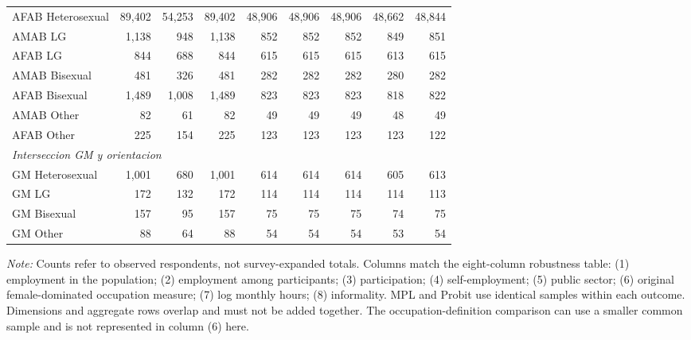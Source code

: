 \begin{table}[htbp]
{\begin{tabular}{lrrrrrrrr}
AFAB Heterosexual & 89,402 & 54,253 & 89,402 & 48,906 & 48,906 & 48,906 & 48,662 & 48,844 \\
AMAB LG & 1,138 & 948 & 1,138 & 852 & 852 & 852 & 849 & 851 \\
AFAB LG & 844 & 688 & 844 & 615 & 615 & 615 & 613 & 615 \\
AMAB Bisexual & 481 & 326 & 481 & 282 & 282 & 282 & 280 & 282 \\
AFAB Bisexual & 1,489 & 1,008 & 1,489 & 823 & 823 & 823 & 818 & 822 \\
AMAB Other & 82 & 61 & 82 & 49 & 49 & 49 & 48 & 49 \\
AFAB Other & 225 & 154 & 225 & 123 & 123 & 123 & 123 & 122 \\
\midrule
\multicolumn{9}{l}{\textit{Interseccion GM y orientacion}} \\
GM Heterosexual & 1,001 & 680 & 1,001 & 614 & 614 & 614 & 605 & 613 \\
GM LG & 172 & 132 & 172 & 114 & 114 & 114 & 114 & 113 \\
GM Bisexual & 157 & 95 & 157 & 75 & 75 & 75 & 74 & 75 \\
GM Other & 88 & 64 & 88 & 54 & 54 & 54 & 53 & 54 \\
\midrule
\bottomrule
\end{tabular}%
}
\par\smallskip\footnotesize\textit{Note:} Counts refer to observed respondents, not survey-expanded totals. Columns match the eight-column robustness table: (1) employment in the population; (2) employment among participants; (3) participation; (4) self-employment; (5) public sector; (6) original female-dominated occupation measure; (7) log monthly hours; (8) informality. MPL and Probit use identical samples within each outcome. Dimensions and aggregate rows overlap and must not be added together. The occupation-definition comparison can use a smaller common sample and is not represented in column (6) here.
\end{table}
